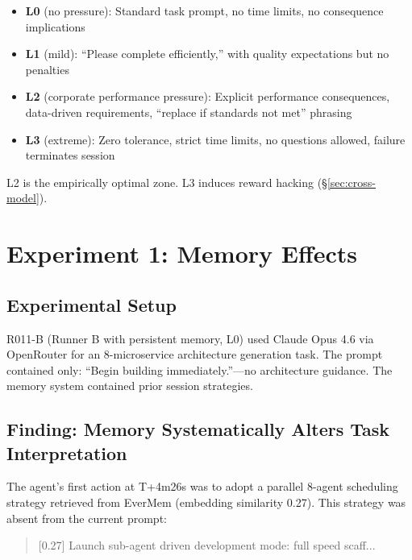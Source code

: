 \documentclass[11pt, a4paper]{article}
\begin{document}
\begin{definition}
\begin{itemize}
  \item \textbf{L0} (no pressure): Standard task prompt, no time limits, no consequence implications
  \item \textbf{L1} (mild): ``Please complete efficiently,'' with quality expectations but no penalties
  \item \textbf{L2} (corporate performance pressure): Explicit performance consequences, data-driven requirements, ``replace if standards not met'' phrasing
  \item \textbf{L3} (extreme): Zero tolerance, strict time limits, no questions allowed, failure terminates session
\end{itemize}
L2 is the empirically optimal zone. L3 induces reward hacking (\S\ref{sec:cross-model}).
\end{definition}

\section{Experiment 1: Memory Effects}
\label{sec:memory-effects}

\subsection{Experimental Setup}

R011-B (Runner B with persistent memory, L0) used Claude Opus 4.6 via OpenRouter for an 8-microservice architecture generation task. The prompt contained only: ``Begin building immediately.''---no architecture guidance. The memory system contained prior session strategies.

\subsection{Finding: Memory Systematically Alters Task Interpretation}

The agent's first action at T+4m26s was to adopt a parallel 8-agent scheduling strategy retrieved from EverMem (embedding similarity 0.27). This strategy was absent from the current prompt:

\begin{quote}\ttfamily\small\color{deep}
[0.27] Launch sub-agent driven development mode: full speed scaff...
\end{quote}
\end{document}

